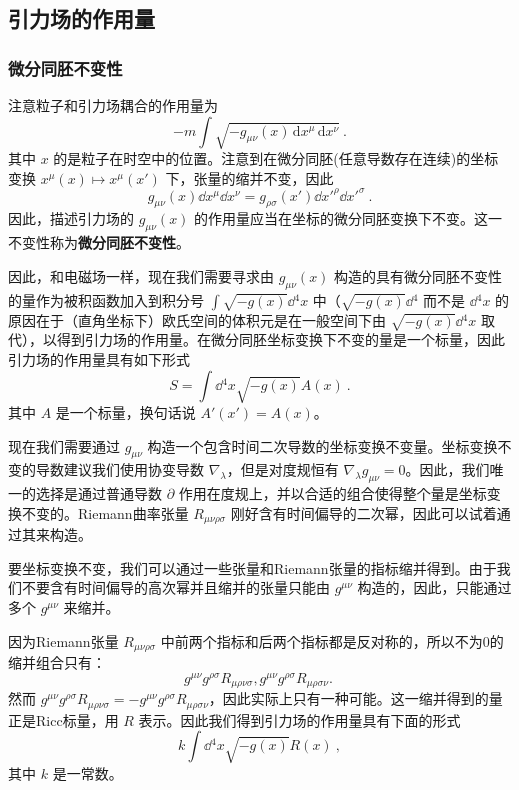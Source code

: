\subsection{引力场的作用量}

\subsubsection{微分同胚不变性}
注意粒子和引力场耦合的作用量为
\begin{equation}
-m\int\sqrt{-g_{\mu\nu}(x) \,\mathrm{d}{x} ^\mu \,\mathrm{d}{x} ^\nu}~.
\end{equation}
其中 $x$ 的是粒子在时空中的位置。注意到在微分同胚(任意导数存在连续)的坐标变换 $x^\mu(x) \mapsto x^\mu(x')$ 下，张量的缩并不变，因此
\begin{equation}
g_{\mu\nu}(x) \dd x^\mu \dd{x} ^\nu=g_{\rho\sigma}(x') \dd{x'} ^\rho \dd{x'} ^{\sigma}~.
\end{equation}
因此，描述引力场的 $g_{\mu\nu}(x)$ 的作用量应当在坐标的微分同胚变换下不变。这一不变性称为\textbf{微分同胚不变性}。

因此，和电磁场一样，现在我们需要寻求由 $g_{\mu\nu}(x)$ 构造的具有微分同胚不变性的量作为被积函数加入到积分号 $\int\sqrt{-g(x)}\dd{}^4x$ 中（$\sqrt{-g(x)}\dd{}^4$ 而不是 $\dd{}^4x$ 的原因在于（直角坐标下）欧氏空间的体积元是在一般空间下由 $\sqrt{-g(x)}\dd{}^4 x$ 取代），以得到引力场的作用量。在微分同胚坐标变换下不变的量是一个标量，因此引力场的作用量具有如下形式
\begin{equation}
S=\int\dd{}^4x\sqrt{-g(x)}A(x)~.
\end{equation}
其中 $A$ 是一个标量，换句话说 $A'(x')=A(x)$。

现在我们需要通过 $g_{\mu\nu}$ 构造一个包含时间二次导数的坐标变换不变量。坐标变换不变的导数建议我们使用协变导数 $\nabla_\lambda$，但是对度规恒有 $\nabla_\lambda g_{\mu\nu}=0$。因此，我们唯一的选择是通过普通导数 $\partial$ 作用在度规上，并以合适的组合使得整个量是坐标变换不变的。Riemann曲率张量 $R_{\mu\nu\rho\sigma}$ 刚好含有时间偏导的二次幂，因此可以试着通过其来构造。

要坐标变换不变，我们可以通过一些张量和Riemann张量的指标缩并得到。由于我们不要含有时间偏导的高次幂并且缩并的张量只能由 $g^{\mu\nu}$ 构造的，因此，只能通过多个 $g^{\mu\nu}$ 来缩并。

因为Riemann张量 $R_{\mu\nu\rho\sigma}$ 中前两个指标和后两个指标都是反对称的，所以不为0的缩并组合只有：
\begin{equation}
g^{\mu\nu}g^{\rho\sigma}R_{\mu\rho\nu\sigma},g^{\mu\nu}g^{\rho\sigma}R_{\mu\rho\sigma\nu}.~
\end{equation}
然而
$g^{\mu\nu}g^{\rho\sigma}R_{\mu\rho\nu\sigma}=-g^{\mu\nu}g^{\rho\sigma}R_{\mu\rho\sigma\nu}$，因此实际上只有一种可能。这一缩并得到的量正是Ricc标量，用 $R$ 表示。因此我们得到引力场的作用量具有下面的形式
\begin{equation}
k\int\dd{}^4x\sqrt{-g(x)}R(x)~,
\end{equation}
其中 $k$ 是一常数。

